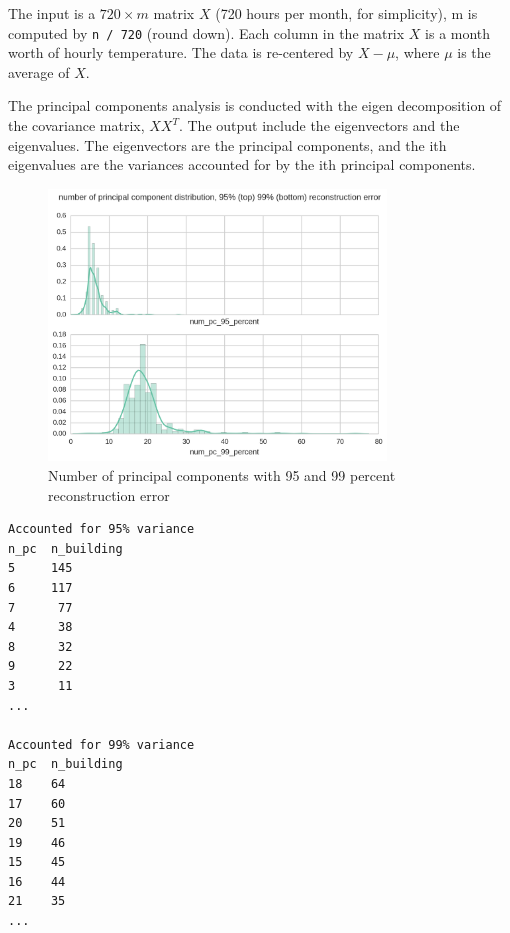 \documentclass[12pt]{article}
\begin{document}
The input is a $720 \times m$ matrix $X$ (720 hours per month, for
simplicity), m is computed by \texttt{n / 720} (round down). Each
column in the matrix $X$ is a month worth of hourly temperature. The
data is re-centered by $X - \mu$, where $\mu$ is the average of $X$.

The principal components analysis is conducted with the eigen
decomposition of the covariance matrix, $XX^T$. The output include the
eigenvectors and the eigenvalues. The eigenvectors are the principal
components, and the ith eigenvalues are the variances accounted for by
the ith principal components. 
\begin{figure}[h!]
  \centering
  \includegraphics[width=0.8\textwidth]{images/num_pcs.png}
  \caption{Number of principal components with 95 and 99 percent reconstruction error}
  \label{fig:num_pcs}
\end{figure}
\FloatBarrier
\small
\begin{verbatim}
Accounted for 95% variance
n_pc  n_building
5     145
6     117
7      77
4      38
8      32
9      22
3      11
...

Accounted for 99% variance
n_pc  n_building
18    64
17    60
20    51
19    46
15    45
16    44
21    35
...
\end{verbatim}
\end{document}
